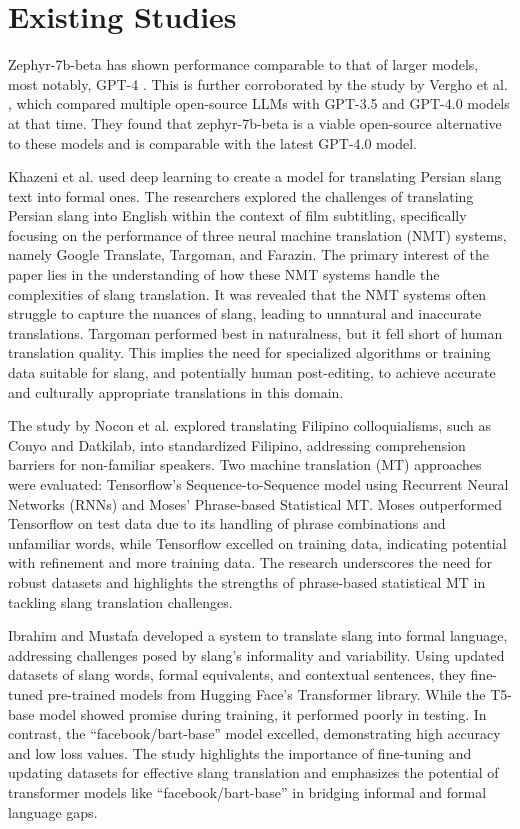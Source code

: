 \section{Existing Studies}
Zephyr-7b-beta has shown performance comparable to that of larger models, most notably, GPT-4 \cite{tunstall2023zephyr}. This is further corroborated by the study by Vergho et al. \cite{Vergho}, which compared multiple open-source LLMs with GPT-3.5 and GPT-4.0 models at that time. They found that zephyr-7b-beta is a viable open-source alternative to these models and is comparable with the latest GPT-4.0 model.

Khazeni et al. \cite{Khazeni} used deep learning to create a model for translating Persian slang text into formal ones. The researchers explored the challenges of translating Persian slang into English within the context of film subtitling, specifically focusing on the performance of three neural machine translation (NMT) systems, namely Google Translate, Targoman, and Farazin. The primary interest of the paper lies in the understanding of how these NMT systems handle the complexities of slang translation. It was revealed that the NMT systems often struggle to capture the nuances of slang, leading to unnatural and inaccurate translations. Targoman performed best in naturalness, but it fell short of human translation quality. This implies the need for specialized algorithms or training data suitable for slang, and potentially human post-editing, to achieve accurate and culturally appropriate translations in this domain.

The study by Nocon et al. \cite{Nocon_Kho_Arroyo_2018} explored translating Filipino colloquialisms, such as Conyo and Datkilab, into standardized Filipino, addressing comprehension barriers for non-familiar speakers. Two machine translation (MT) approaches were evaluated: Tensorflow's Sequence-to-Sequence model using Recurrent Neural Networks (RNNs) and Moses' Phrase-based Statistical MT. Moses outperformed Tensorflow on test data due to its handling of phrase combinations and unfamiliar words, while Tensorflow excelled on training data, indicating potential with refinement and more training data. The research underscores the need for robust datasets and highlights the strengths of phrase-based statistical MT in tackling slang translation challenges.

Ibrahim and Mustafa \cite{Ibrahim_Sharief} developed a system to translate slang into formal language, addressing challenges posed by slang's informality and variability. Using updated datasets of slang words, formal equivalents, and contextual sentences, they fine-tuned pre-trained models from Hugging Face's Transformer library. While the T5-base model showed promise during training, it performed poorly in testing. In contrast, the “facebook/bart-base” model excelled, demonstrating high accuracy and low loss values. The study highlights the importance of fine-tuning and updating datasets for effective slang translation and emphasizes the potential of transformer models like “facebook/bart-base” in bridging informal and formal language gaps. 

